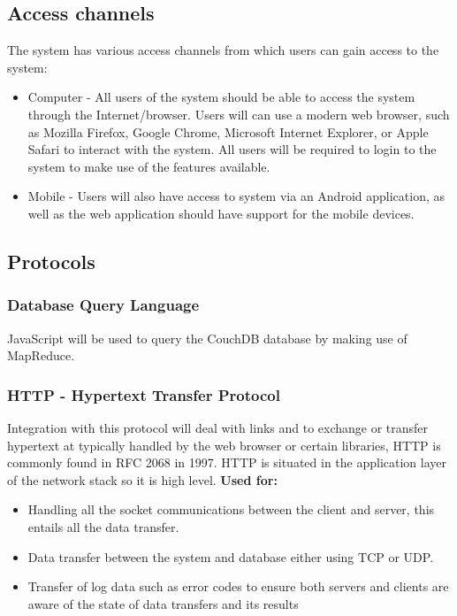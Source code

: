 \documentclass[a4paper]{article}
\begin{document}
	\subsection{Access channels}
	The system has various access channels from which users can gain access to the system:
	\begin{itemize}
		\item Computer - All users of the system should be able to access the system through the Internet/browser. Users will can use a modern web browser, such as Mozilla Firefox, Google Chrome, Microsoft Internet Explorer, or Apple Safari to interact with the system. All users will be required to login to the system to make use of the features available.
		\item Mobile - Users will also have access to system via an Android application, as well as the web application should have support for the mobile devices.
	\end{itemize} 	
	
	
	\subsection{Protocols}
	\subsubsection{Database Query Language}
	JavaScript will be used to query the CouchDB database by making use of MapReduce.
	
	\subsubsection{HTTP - Hypertext Transfer Protocol}
	Integration with this protocol will deal with links and to exchange or transfer hypertext at typically handled by the web browser or certain libraries, HTTP is commonly found in RFC 2068 in 1997. HTTP is situated in the application layer of the network stack so it is high level.
	\textbf{Used for:	}
	\begin{itemize}
		\item{Handling all the socket communications between the client and server, this entails all the data transfer.}
		\item{Data transfer between the system and database either using TCP or UDP.}
		\item{Transfer of log data such as error codes to ensure both servers and clients are aware of the state of data transfers and its results}
	\end{itemize}
	
\end{document}
